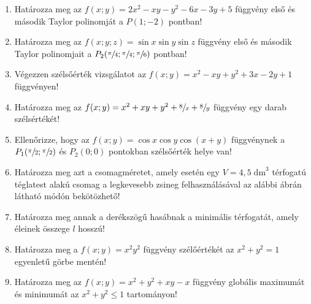 \documentclass[a4paper, 12pt]{scrartcl}
\begin{document}
\begin{enumerate}
  \item Határozza meg az $f(x; y)=2x^2-xy-y^2-6x-3y+5$ függvény első és második
        Taylor polinomját a $P(1; -2)$ pontban!

  \item Határozza meg az $f(x; y; z)=\sin x \sin y \sin z$ függvény első és
        második Taylor polinomjait a $P_2(\sfrac{\pi}{4}; \sfrac{\pi}{4};
          \sfrac{\pi}{6})$ pontban!

  \item Végezzen szélsőérték vizsgálatot az $f(x; y)=x^2-xy+y^2+3x-2y+1$
        függvényen!

  \item Határozza meg az $f(x; y)=x^2+xy+y^2+\sfrac{8}{x}+\sfrac{8}{y}$ függvény
        egy darab szélsértékét!

  \item Ellenőrizze, hogy az $f(x; y)=\cos x \cos y \cos (x+y)$ függvénynek a
        $P_1(\sfrac{\pi}{2}; \sfrac{\pi}{2})$ és $P_2(0; 0)$ pontokban
        szélsőérték helye van!

  \item Határozza meg azt a csomagméretet, amely esetén egy
        $V=4,5\;\mathrm{dm}^3$ térfogatú téglatest alakú csomag a legkevesebb
        zsineg felhasználásával az alábbi ábrán látható módón bekötözhető!
        \begin{center}
        \end{center}

  \item Határozza meg annak a derékszögű hasábnak a minimális térfogatát, amely
        éleinek összege $l$ hosszú!

  \item Határozza meg a $f(x; y)=x^2y^2$ függvény szélőértékét az
        $x^2+y^2=1$ egyenletű görbe mentén!

  \item Határozza meg az $f(x; y)=x^2+y^2+xy-x$ függvény globális maximumát és
        minimumát az $x^2+y^2\leq1$ tartományon!
\end{enumerate}
\end{document}
